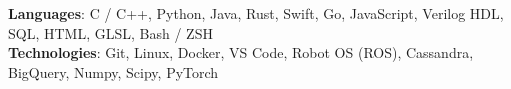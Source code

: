 \begin{itemize}[leftmargin=0.15in, label={}]
    \small{\item{
        \textbf{Languages}{: C / C++, Python, Java, Rust, Swift, Go, JavaScript, Verilog HDL, SQL, HTML, GLSL, Bash / ZSH} \\
        \textbf{Technologies}{: Git, Linux, Docker, VS Code, Robot OS (ROS), Cassandra, BigQuery, Numpy, Scipy, PyTorch} \\
    }}
\end{itemize}